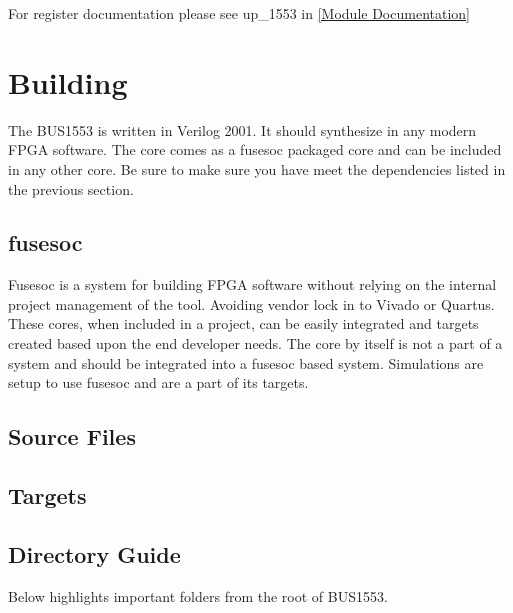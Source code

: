 For register documentation please see up\_1553 in \ref{Module Documentation}

\section{Building}

\par
The BUS1553 is written in Verilog 2001. It should synthesize in any modern FPGA software. The core comes as a fusesoc packaged core and can be
included in any other core. Be sure to make sure you have meet the dependencies listed in the previous section.

\subsection{fusesoc}
\par
Fusesoc is a system for building FPGA software without relying on the internal project management of the tool. Avoiding vendor lock in to Vivado or Quartus.
These cores, when included in a project, can be easily integrated and targets created based upon the end developer needs. The core by itself is not a part of
a system and should be integrated into a fusesoc based system. Simulations are setup to use fusesoc and are a part of its targets.

\subsection{Source Files}







\subsection{Targets}







\subsection{Directory Guide}

\par
Below highlights important folders from the root of BUS1553.

